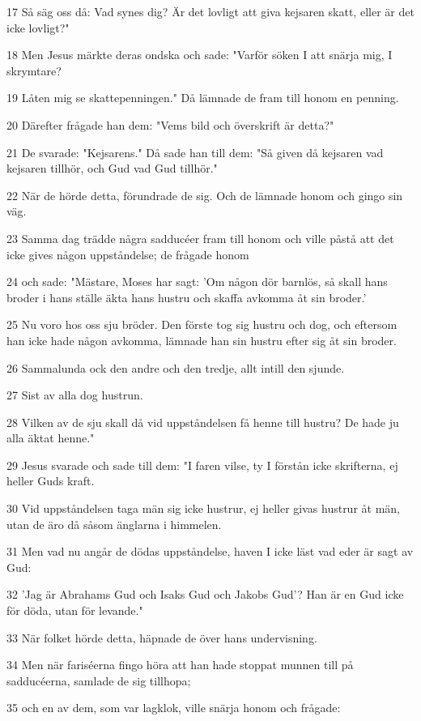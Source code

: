 \par 17 Så säg oss då: Vad synes dig? Är det lovligt att giva kejsaren skatt, eller är det icke lovligt?"
\par 18 Men Jesus märkte deras ondska och sade: "Varför söken I att snärja mig, I skrymtare?
\par 19 Låten mig se skattepenningen." Då lämnade de fram till honom en penning.
\par 20 Därefter frågade han dem: "Vems bild och överskrift är detta?"
\par 21 De svarade: "Kejsarens." Då sade han till dem: "Så given då kejsaren vad kejsaren tillhör, och Gud vad Gud tillhör."
\par 22 När de hörde detta, förundrade de sig. Och de lämnade honom och gingo sin väg.
\par 23 Samma dag trädde några sadducéer fram till honom och ville påstå att det icke gives någon uppståndelse; de frågade honom
\par 24 och sade: "Mästare, Moses har sagt: 'Om någon dör barnlös, så skall hans broder i hans ställe äkta hans hustru och skaffa avkomma åt sin broder.'
\par 25 Nu voro hos oss sju bröder. Den förste tog sig hustru och dog, och eftersom han icke hade någon avkomma, lämnade han sin hustru efter sig åt sin broder.
\par 26 Sammalunda ock den andre och den tredje, allt intill den sjunde.
\par 27 Sist av alla dog hustrun.
\par 28 Vilken av de sju skall då vid uppståndelsen få henne till hustru? De hade ju alla äktat henne."
\par 29 Jesus svarade och sade till dem: "I faren vilse, ty I förstån icke skrifterna, ej heller Guds kraft.
\par 30 Vid uppståndelsen taga män sig icke hustrur, ej heller givas hustrur åt män, utan de äro då såsom änglarna i himmelen.
\par 31 Men vad nu angår de dödas uppståndelse, haven I icke läst vad eder är sagt av Gud:
\par 32 'Jag är Abrahams Gud och Isaks Gud och Jakobs Gud'? Han är en Gud icke för döda, utan för levande."
\par 33 När folket hörde detta, häpnade de över hans undervisning.
\par 34 Men när fariséerna fingo höra att han hade stoppat munnen till på sadducéerna, samlade de sig tillhopa;
\par 35 och en av dem, som var lagklok, ville snärja honom och frågade:
